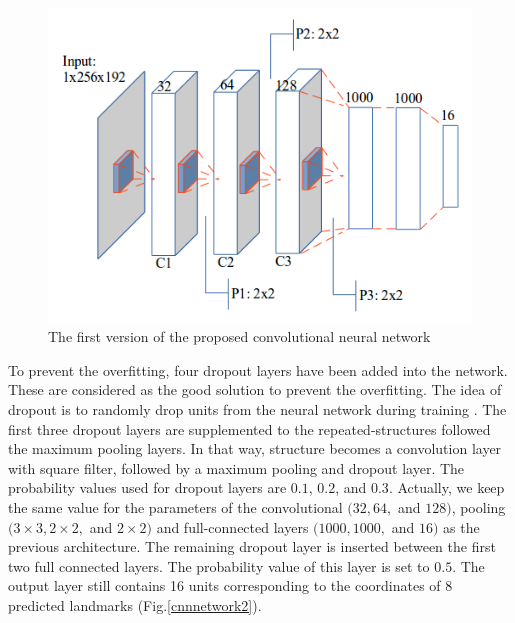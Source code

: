 \documentclass[10pt]{article}
\begin{document}
\begin{figure}[htbp]
\centering
\includegraphics[scale=0.45]{images/architecture1}
\caption{The first version of the proposed convolutional neural network} 
\label{cnnnetwork1}
\end{figure}


To prevent the overfitting, four dropout layers have been added into the network. These are considered as the good solution to prevent the overfitting. The idea of dropout is to randomly drop units from the neural network during training \cite{srivastava2014dropout}. The first three dropout layers are supplemented to the repeated-structures followed the maximum pooling layers. In that way, structure becomes a convolution layer with square filter, followed by a maximum pooling and dropout layer. The probability values used for dropout layers are $0.1$, $0.2$, and $0.3$. Actually, we keep the same value for the parameters of the convolutional $(32, 64,$ and $128)$, pooling $(3 \times 3, 2 \times 2,$ and $2 \times 2)$ and full-connected layers $(1000, 1000,$ and $16)$ as the previous architecture. 
The remaining dropout layer is inserted between the first
two full connected layers. The probability value of this layer
is set to $0.5$. The output layer still contains 16 units corresponding to the coordinates of 8 predicted landmarks (Fig.\ref{cnnnetwork2}).
\end{document}
